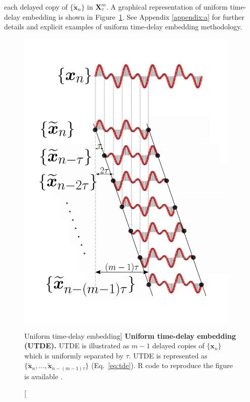 each delayed copy 
of $\{ \boldsymbol{ \tilde{x} }_n \}$ in $\boldsymbol{X}^{m}_{\tau}$.
A graphical representation of uniform time-delay embedding is shown in 
Figure~\ref{fig:utde}. See Appendix \ref{appendix:a} for further details 
and explicit examples of uniform time-delay embedding methodology. 
\begin{figure}
 \centering
   \includegraphics[width=0.95\textwidth]{fig_3_02}
   \caption
	[Uniform time-delay embedding]{
	{\bf Uniform time-delay embedding (UTDE).} 
	UTDE is illustrated as $m-1$ delayed copies
   	of $\{ \boldsymbol{x}_n \}$ which is uniformly separated by $\tau$.
	UTDE is represented as
	$\{ \boldsymbol{ \tilde{x} }_n, \dots,  
	\boldsymbol{ \tilde{x} }_{n -(m-1)\tau}   \}$ (Eq.~\ref{eq:tde}).
	R code to reproduce the figure is available \cite{xochicale2018}.
   }
   \label{fig:utde}
\end{figure}

